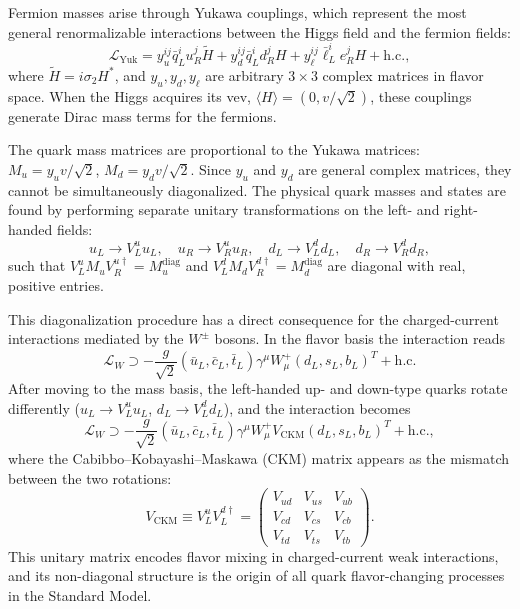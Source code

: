 Fermion masses arise through Yukawa couplings, which represent the most general renormalizable interactions between the Higgs field and the fermion fields:
\begin{equation}
    \mathcal{L}_{\text{Yuk}} = y_{u}^{ij} \bar{q}_{L}^{i} u_{R}^{j} \tilde{H} + y_{d}^{ij} \bar{q}_{L}^{i} d_{R}^{j} H + y_{\ell}^{ij} \bar{\ell}_L^{i} e_{R}^{j} H + \text{h.c.},
\end{equation}
where $\tilde{H} = i\sigma_2 H^*$, and $y_{u}, y_{d}, y_{\ell}$ are arbitrary $3 \times 3$ complex matrices in flavor space. When the Higgs acquires its vev, $\langle H \rangle = (0, v/\sqrt{2})$, these couplings generate Dirac mass terms for the fermions.


The quark mass matrices are proportional to the Yukawa matrices: $M_u = y_u v/\sqrt{2}$, $M_d = y_d v/\sqrt{2}$. Since $y_u$ and $y_d$ are general complex matrices, they cannot be simultaneously diagonalized. The physical quark masses and states are found by performing separate unitary transformations on the left- and right-handed fields:
\begin{equation}
    u_L \to V_L^u u_L, \quad u_R \to V_R^u u_R, \quad d_L \to V_L^d d_L, \quad d_R \to V_R^d d_R,
\end{equation}
such that $V_L^u M_u V_R^{u\dagger} = M_u^{\text{diag}}$ and $V_L^d M_d V_R^{d\dagger} = M_d^{\text{diag}}$ are diagonal with real, positive entries.

This diagonalization procedure has a direct consequence for the charged-current interactions mediated by the $W^{\pm}$ bosons. In the flavor basis the interaction reads
\begin{equation}
    \mathcal{L}_{W} \supset -\frac{g}{\sqrt{2}} (\bar{u}_L, \bar{c}_L, \bar{t}_L) \gamma^\mu W_\mu^+ (d_L, s_L, b_L)^T + \text{h.c.}
\end{equation}
After moving to the mass basis, the left-handed up- and down-type quarks rotate differently ($u_L \to V_L^u u_L$, $d_L \to V_L^d d_L$), and the interaction becomes
\begin{equation}
    \mathcal{L}_{W} \supset -\frac{g}{\sqrt{2}} (\bar{u}_L, \bar{c}_L, \bar{t}_L) \gamma^\mu W_\mu^+ V_{\mathrm{CKM}} (d_L, s_L, b_L)^T + \text{h.c.},
\end{equation}
where the Cabibbo–Kobayashi–Maskawa (CKM) matrix appears as the mismatch between the two rotations:
\begin{equation}
    V_{\mathrm{CKM}} \equiv V_{L}^{u} V_{L}^{d \dagger} = \begin{pmatrix}
        V_{ud} & V_{us} & V_{ub} \\
        V_{cd} & V_{cs} & V_{cb} \\
        V_{td} & V_{ts} & V_{tb}
    \end{pmatrix}.
\end{equation}
This unitary matrix encodes flavor mixing in charged-current weak interactions, and its non-diagonal structure is the origin of all quark flavor-changing processes in the Standard Model.


